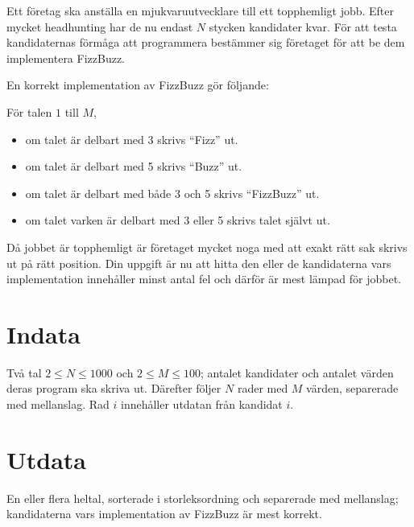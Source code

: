 Ett företag ska anställa en mjukvaruutvecklare till ett topphemligt jobb.
Efter mycket headhunting har de nu endast $N$ stycken kandidater kvar.
För att testa kandidaternas förmåga att programmera bestämmer sig företaget för att be dem implementera FizzBuzz.

En korrekt implementation av FizzBuzz gör följande:

För talen $1$ till $M$,
\begin{itemize}
 \item om talet är delbart med 3 skrivs ``Fizz'' ut.
 \item om talet är delbart med 5 skrivs ``Buzz'' ut.
 \item om talet är delbart med både 3 och 5 skrivs ``FizzBuzz'' ut. 
 \item om talet varken är delbart med 3 eller 5 skrivs talet självt ut. 
\end{itemize}

Då jobbet är topphemligt är företaget mycket noga med att exakt rätt sak skrivs ut på rätt position.
Din uppgift är nu att hitta den eller de kandidaterna vars implementation innehåller minst antal fel och därför är mest lämpad för jobbet.

\section*{Indata}
Två tal $2 \leq N \leq 1000$ och $2 \leq M \leq 100$; antalet kandidater och antalet värden deras program ska skriva ut.
Därefter följer $N$ rader med $M$ värden, separerade med mellanslag. Rad $i$ innehåller utdatan från kandidat $i$.  

\section*{Utdata}
En eller flera heltal, sorterade i storleksordning och separerade med mellanslag; kandidaterna vars implementation av FizzBuzz är mest korrekt. 
